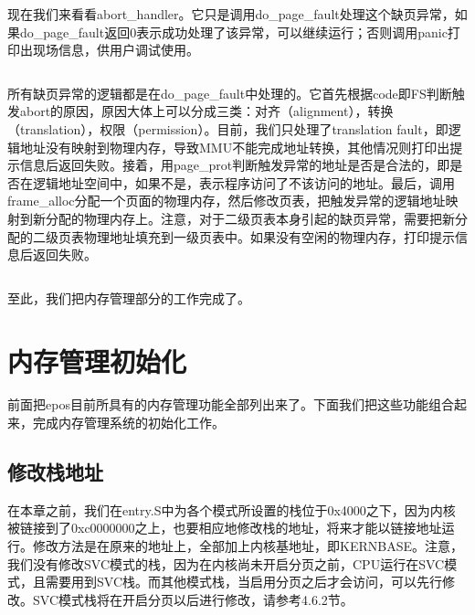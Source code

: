 \documentclass[main.tex]{subfiles}
\begin{document}
\begin{CJK*}{UTF8}{song}
\inputminted[firstline=155,lastline=176,linenos,numbersep=5pt,frame=lines,framesep=2mm]{gas}{src/chapter04/kernel/entry.S}

现在我们来看看abort\_handler。它只是调用do\_page\_fault处理这个缺页异常，如果do\_page\_fault返回0表示成功处理了该异常，可以继续运行；否则调用panic打印出现场信息，供用户调试使用。

\inputminted[firstline=356,lastline=362,linenos,numbersep=5pt,frame=lines,framesep=2mm]{c}{src/chapter04/kernel/machdep.c}

所有缺页异常的逻辑都是在do\_page\_fault中处理的。它首先根据code即FS判断触发abort的原因，原因大体上可以分成三类：对齐（alignment），转换（translation），权限（permission）。目前，我们只处理了translation fault，即逻辑地址没有映射到物理内存，导致MMU不能完成地址转换，其他情况则打印出提示信息后返回失败。接着，用page\_prot判断触发异常的地址是否是合法的，即是否在逻辑地址空间中，如果不是，表示程序访问了不该访问的地址。最后，调用frame\_alloc分配一个页面的物理内存，然后修改页表，把触发异常的逻辑地址映射到新分配的物理内存上。注意，对于二级页表本身引起的缺页异常，需要把新分配的二级页表物理地址填充到一级页表中。如果没有空闲的物理内存，打印提示信息后返回失败。

\inputminted[firstline=245,lastline=354,linenos,numbersep=5pt,frame=lines,framesep=2mm]{c}{src/chapter04/kernel/machdep.c}

至此，我们把内存管理部分的工作完成了。

\section{内存管理初始化}
前面把epos目前所具有的内存管理功能全部列出来了。下面我们把这些功能组合起来，完成内存管理系统的初始化工作。
\subsection{修改栈地址}
在本章之前，我们在entry.S中为各个模式所设置的栈位于0x4000之下，因为内核被链接到了0xc0000000之上，也要相应地修改栈的地址，将来才能以链接地址运行。修改方法是在原来的地址上，全部加上内核基地址，即KERNBASE。注意，我们没有修改SVC模式的栈，因为在内核尚未开启分页之前，CPU运行在SVC模式，且需要用到SVC栈。而其他模式栈，当启用分页之后才会访问，可以先行修改。SVC模式栈将在开启分页以后进行修改，请参考4.6.2节。

\inputminted[firstline=125,lastline=142,linenos,numbersep=5pt,frame=lines,framesep=2mm]{gas}{src/chapter04/kernel/entry.S}


\end{CJK*}
\end{document}
